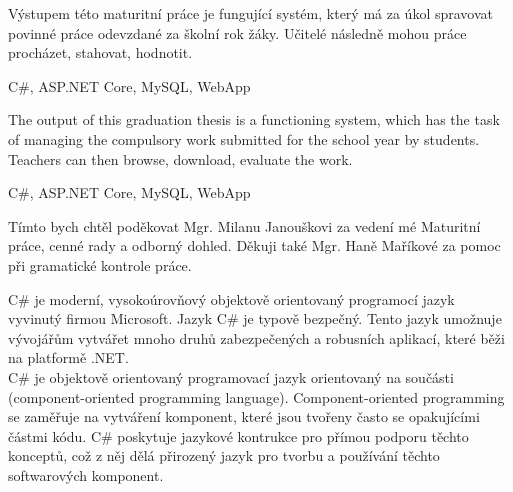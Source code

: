 \documentclass[a4paper, 12pt]{report}
\begin{document}
	
	\titulniStrana
	
	\anotace
	Výstupem této maturitní práce je fungující systém, který má za úkol spravovat povinné práce odevzdané za školní rok žáky. Učitelé následně mohou práce procházet, stahovat, hodnotit.

	\klicovaslova
	C\#, ASP.NET Core, MySQL, WebApp

	\annotation
	The output of this graduation thesis is a functioning system, which has the task of managing the compulsory work submitted for the school year by students. Teachers can then browse, download, evaluate the work.

	\keywords
	C\#, ASP.NET Core, MySQL, WebApp

	\podekovani
	Tímto bych chtěl poděkovat Mgr. Milanu Janouškovi za vedení mé Maturitní práce, cenné rady a odborný dohled. Děkuji také Mgr. Haně Maříkové za pomoc při gramatické kontrole práce.
	
	\obsah
	
	C\# je moderní, vysokoúrovňový objektově orientovaný programocí jazyk vyvinutý firmou Microsoft. Jazyk C\# je typově bezpečný. Tento jazyk umožnuje vývojářům vytvářet mnoho druhů zabezpečených a robusních aplikací, které běži na platformě .NET.\\
	C\# je objektově orientovaný programovací jazyk orientovaný na součásti (component-oriented programming language). Component-oriented programming se zaměřuje na vytváření komponent, které jsou tvořeny často se opakujícími částmi kódu. C\# poskytuje jazykové kontrukce pro přímou podporu těchto konceptů, což z něj dělá přirozený jazyk pro tvorbu a používání těchto softwarových komponent.


	\seznamTabulek
	
	\seznamObrazku
	
	
	
\end{document}
